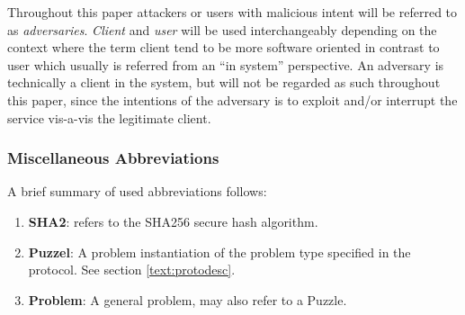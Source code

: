 Throughout this paper attackers or users with malicious intent will be referred to as \emph{adversaries}.
\emph{Client} and \emph{user} will be used interchangeably depending on the context where the term client tend to be more software oriented in contrast to user which usually is referred from an ``in system'' perspective.
An adversary is technically a client in the system, but will not be regarded as such throughout this paper, since the intentions of the adversary is to exploit and/or interrupt the service vis-a-vis the legitimate client. 

\subsubsection*{Miscellaneous Abbreviations}
A brief summary of used abbreviations follows:
\begin{enumerate}
\item {\textbf{ SHA2}}: refers to the SHA256 secure hash algorithm\cite{sha2}.
\item \textbf{ Puzzel}: A problem instantiation of the problem type specified in the protocol. See section \ref{text:protodesc}.
\item \textbf{ Problem}: A general problem, may also refer to a Puzzle.
\end{enumerate}